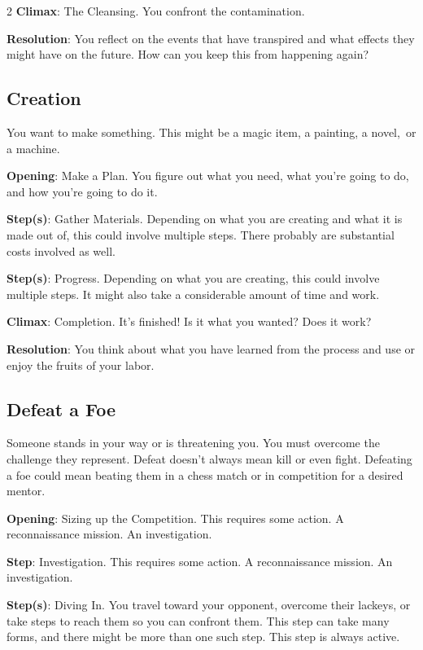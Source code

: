 \begin{multicols}{2}
\textbf{Climax}: The Cleansing. You confront the contamination. 

\textbf{Resolution}: You reflect on the events that have transpired and what effects they might have on the future. How can you keep this from happening again?

\subsection{Creation}

You want to make something. This might be a magic item, a painting, a novel, or a machine. 

\textbf{Opening}: Make a Plan. You figure out what you need, what you’re going to do, and how you’re going to do it.

\textbf{Step(s)}: Gather Materials. Depending on what you are creating and what it is made out of, this could involve multiple steps. There probably are substantial costs involved as well.

\textbf{Step(s)}: Progress. Depending on what you are creating, this could involve multiple steps. It might also take a considerable amount of time and work.

\textbf{Climax}: Completion. It’s finished! Is it what you wanted? Does it work? 

\textbf{Resolution}: You think about what you have learned from the process and use or enjoy the fruits of your labor.

\subsection{Defeat a Foe}

Someone stands in your way or is threatening you. You must overcome the challenge they represent. Defeat doesn’t always mean kill or even fight. Defeating a foe could mean beating them in a chess match or in competition for a desired mentor.

\textbf{Opening}: Sizing up the Competition. This requires some action. A reconnaissance mission. An investigation.

\textbf{Step}: Investigation. This requires some action. A reconnaissance mission. An investigation.

\textbf{Step(s)}: Diving In. You travel toward your opponent, overcome their lackeys, or take steps to reach them so you can confront them. This step can take many forms, and there might be more than one such step. This step is always active.


\end{multicols}
